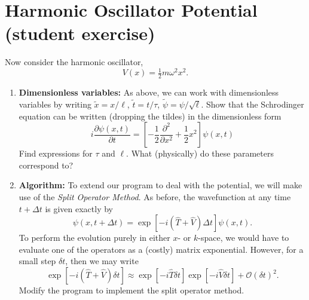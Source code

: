 \documentclass[11pt]{article}
\begin{document}
\section{Harmonic Oscillator Potential (student exercise)}
 Now consider the harmonic oscillator,
\begin{equation}
V(x) = \tfrac{1}{2} m \omega^2 x^2.
\end{equation}
\begin{enumerate}
\item \textbf{Dimensionless variables:}  As above, we can work with dimensionless variables by writing  $\tilde x = x / \ell$, $\tilde t  = t / \tau$, $\tilde \psi = \psi /\sqrt{\ell}$.  Show that the Schrodinger equation can be written (dropping the tildes) in the dimensionless form 
\begin{equation}
i \frac{\partial \psi(x,t)}{\partial t} = \left[ -\frac{1}{2} \frac{\partial^2 }{\partial x^2} + \frac{1}{2} x^2 \right ] \psi(x,t)
\end{equation}
Find expressions for $\tau$ and $\ell$. What (physically) do these parameters correspond to? 



\item \textbf{Algorithm:} To extend our program to deal with the potential, we will make use of the \emph{Split Operator Method}. As before, the wavefunction at any time $t +\Delta t$ is  given exactly by
\begin{equation}
\psi(x, t+\Delta t) = \exp\left[- i ( \hat T + \hat V)\Delta t  \right] \psi(x,t). 
\end{equation}
To perform the evolution purely  in either $x$- or $k$-space, we would have to evaluate one of the operators as a (costly) matrix exponential. However, for a small step $\delta t$, then we may write 
\begin{equation}
\exp\left[- i (\hat T + \hat V) \delta t  \right] \approx \exp \left[ - i \hat T \delta t  \right] \exp \left[ - i \hat V \delta t  \right]  + \mathcal{O}(\delta t)^2.
\end{equation}
Modify the program to implement the split operator method. 


\end{enumerate}
\end{document}

